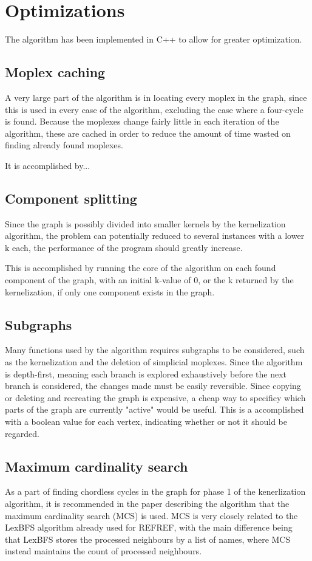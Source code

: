 \documentclass{article}
\begin{document}
	\section{Optimizations}
	The algorithm has been implemented in C++ to allow for greater optimization.

		\subsection{Moplex caching}
		A very large part of the algorithm is in locating every moplex in the graph, since this is used in every case of the algorithm, excluding the case where a four-cycle is found.
		Because the moplexes change fairly little in each iteration of the algorithm, these are cached in order to reduce the amount of time wasted on finding already found moplexes.

		It is accomplished by...

		\subsection{Component splitting}
		Since the graph is possibly divided into smaller kernels by the kernelization algorithm, the problem can potentially reduced to several instances with a lower k each, the performance of the program should greatly increase.

		This is accomplished by running the core of the algorithm on each found component of the graph, with an initial k-value of 0, or the k returned by the kernelization, if only one component exists in the graph.

		\subsection{Subgraphs}
		Many functions used by the algorithm requires subgraphs to be considered, such as the kernelization and the deletion of simplicial moplexes.
		Since the algorithm is depth-first, meaning each branch is explored exhaustively before the next branch is considered, the changes made must be easily reversible.
		Since copying or deleting and recreating the graph is expensive, a cheap way to specificy which parts of the graph are currently "active" would be useful.
		This is a accomplished with a boolean value for each vertex, indicating whether or not it should be regarded.

		\subsection{Maximum cardinality search}
		\label{subsec:maximum-cardinality-search}
		As a part of finding chordless cycles in the graph for phase 1 of the kenerlization algorithm, it is recommended in the paper describing the algorithm\cite{kernel} that the maximum cardinality search (MCS) is used.
		MCS is very closely related to the LexBFS algorithm already used for REFREF, with the main difference being that LexBFS stores the processed neighbours by a list of names, where MCS instead maintains the count of processed neighbours.
\end{document}
